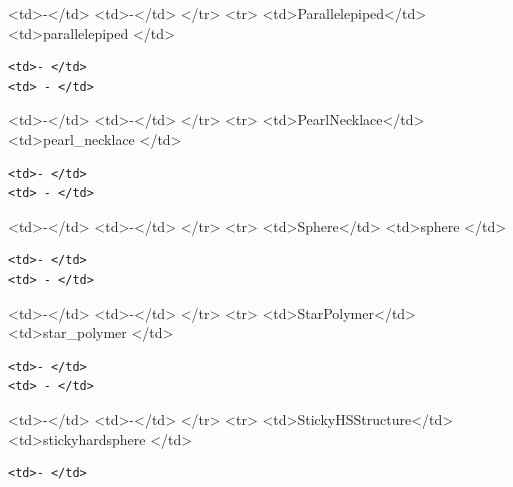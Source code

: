 \textless{}td\textgreater{}-\textless{}/td\textgreater{} \textless{}td\textgreater{}-\textless{}/td\textgreater{} \textless{}/tr\textgreater{} \textless{}tr\textgreater{} \textless{}td\textgreater{}Parallelepiped\textless{}/td\textgreater{} \textless{}td\textgreater{}parallelepiped \textless{}/td\textgreater{}

\begin{verbatim}
<td>- </td>
<td> - </td>
\end{verbatim}

\textless{}td\textgreater{}-\textless{}/td\textgreater{} \textless{}td\textgreater{}-\textless{}/td\textgreater{} \textless{}/tr\textgreater{} \textless{}tr\textgreater{} \textless{}td\textgreater{}PearlNecklace\textless{}/td\textgreater{} \textless{}td\textgreater{}pearl\_necklace \textless{}/td\textgreater{}

\begin{verbatim}
<td>- </td>
<td> - </td>
\end{verbatim}

\textless{}td\textgreater{}-\textless{}/td\textgreater{} \textless{}td\textgreater{}-\textless{}/td\textgreater{} \textless{}/tr\textgreater{} \textless{}tr\textgreater{} \textless{}td\textgreater{}Sphere\textless{}/td\textgreater{} \textless{}td\textgreater{}sphere \textless{}/td\textgreater{}

\begin{verbatim}
<td>- </td>
<td> - </td>
\end{verbatim}

\textless{}td\textgreater{}-\textless{}/td\textgreater{} \textless{}td\textgreater{}-\textless{}/td\textgreater{} \textless{}/tr\textgreater{} \textless{}tr\textgreater{} \textless{}td\textgreater{}StarPolymer\textless{}/td\textgreater{} \textless{}td\textgreater{}star\_polymer \textless{}/td\textgreater{}

\begin{verbatim}
<td>- </td>
<td> - </td>
\end{verbatim}

\textless{}td\textgreater{}-\textless{}/td\textgreater{} \textless{}td\textgreater{}-\textless{}/td\textgreater{} \textless{}/tr\textgreater{} \textless{}tr\textgreater{} \textless{}td\textgreater{}StickyHSStructure\textless{}/td\textgreater{} \textless{}td\textgreater{}stickyhardsphere \textless{}/td\textgreater{}

\begin{verbatim}
<td>- </td>
\end{verbatim}

